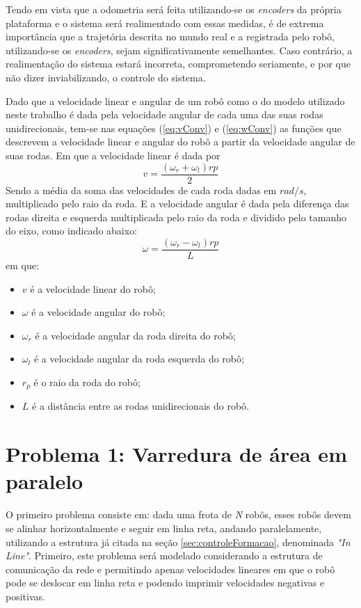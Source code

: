 Tendo em vista que a odometria será feita utilizando-se os \emph{encoders} da própria plataforma e o sistema será realimentado com essas medidas, é de extrema importância que a trajetória descrita no mundo real e a registrada pelo robô, utilizando-se os \emph{encoders}, sejam significativamente semelhantes. Caso contrário, a realimentação do sistema estará incorreta, comprometendo seriamente, e por que não dizer inviabilizando, o controle do sistema. 

Dado que a velocidade linear e angular de um robô como o do modelo utilizado neste trabalho é dada pela velocidade angular de cada uma das suas rodas unidirecionais, tem-se nas equações (\ref{eq:vConv}) e (\ref{eq:wConv}) as funções que descrevem a velocidade linear e angular do robô a partir da velocidade angular de suas rodas. Em que a velocidade linear é dada por
\begin{equation}
	v = \dfrac{(\omega_{r} + \omega_{l}) rp}{2}
	\label{eq:vConv}
\end{equation}
Sendo a média da soma das velocidades de cada roda dadas em $rad/s$, multiplicado pelo raio da roda. E a velocidade angular é dada pela diferença das rodas  direita e esquerda  multiplicada pelo raio da roda e dividido pelo tamanho do eixo, como indicado abaixo:
\begin{equation}
	\omega = \dfrac{(\omega_{r} - \omega_{l}) rp}{L}
	\label{eq:wConv}
\end{equation}
em que:
\begin{itemize}
	\item $v$ é a velocidade linear do robô;
	\item $\omega$ é a velocidade angular do robô;
	\item $\omega_{r}$ é a velocidade angular da roda direita do robô;
	\item $\omega_{l}$ é a velocidade angular da roda esquerda do robô;
	\item $r_{p}$ é o raio da roda do robô;
	\item $L$ é a distância entre as rodas unidirecionais do robô.
\end{itemize}

\section{Problema 1: Varredura de área em paralelo}
\label{sec:P1}
O primeiro problema consiste em: dada uma frota de \emph{N} robôs, esses robôs devem se alinhar horizontalmente e seguir em linha reta, andando paralelamente, utilizando a estrutura já citada na seção \ref{sec:controleFormacao}, denominada \emph{"In Line"}. Primeiro, este problema será modelado considerando a estrutura de comunicação da rede e permitindo apenas velocidades lineares em que o robô pode se deslocar em linha reta e podendo imprimir velocidades negativas e positivas. 

